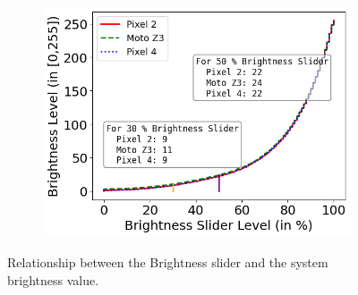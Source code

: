 

\begin{figure}[tb]
	\centering
	\begin{subfigure}[]{0.31\textwidth}
		\includegraphics[width=\textwidth]{figure/brightness_curve.png}
	\end{subfigure}
        \vspace{-0.1in}
	\caption{Relationship between the Brightness slider and the system brightness
		value.}
	\label{fig:brightnessslider_brightnesslevel}
\end{figure}

